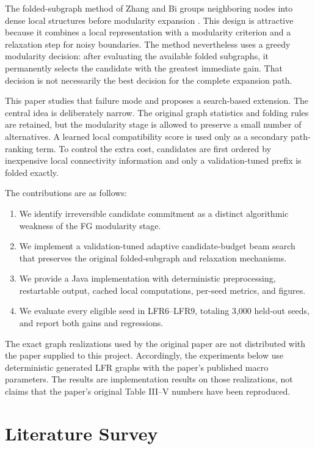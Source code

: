 \documentclass[10pt,journal,compsoc]{IEEEtran}
\begin{document}
The folded-subgraph method of Zhang and Bi groups neighboring nodes into dense
local structures before modularity expansion \cite{zhang2025fg}. This design
is attractive because it combines a local representation with a modularity
criterion and a relaxation step for noisy boundaries. The method nevertheless
uses a greedy modularity decision: after evaluating the available folded
subgraphs, it permanently selects the candidate with the greatest immediate
gain. That decision is not necessarily the best decision for the complete
expansion path.

This paper studies that failure mode and proposes a search-based extension.
The central idea is deliberately narrow. The original graph statistics and
folding rules are retained, but the modularity stage is allowed to preserve a
small number of alternatives. A learned local compatibility score is used only
as a secondary path-ranking term. To control the extra cost, candidates are
first ordered by inexpensive local connectivity information and only a
validation-tuned prefix is folded exactly.

The contributions are as follows:
\begin{enumerate}
  \item We identify irreversible candidate commitment as a distinct algorithmic
  weakness of the FG modularity stage.
  \item We implement a validation-tuned adaptive candidate-budget beam search
  that preserves the original folded-subgraph and relaxation mechanisms.
  \item We provide a Java implementation with deterministic preprocessing,
  restartable output, cached local computations, per-seed metrics, and figures.
  \item We evaluate every eligible seed in LFR6--LFR9, totaling 3,000 held-out
  seeds, and report both gains and regressions.
\end{enumerate}

The exact graph realizations used by the original paper are not distributed
with the paper supplied to this project. Accordingly, the experiments below
use deterministic generated LFR graphs with the paper's published macro
parameters. The results are implementation results on those realizations, not
claims that the paper's original Table III--V numbers have been reproduced.

\section{Literature Survey}
\end{document}
